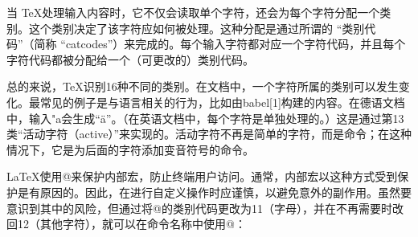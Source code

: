 \documentclass{ctexart}
\begin{document}
当 \TeX 处理输入内容时，它不仅会读取单个字符，还会为每个字符分配一个类别。这个类别决定了该字符应如何被处理。这种分配是通过所谓的 “类别代码”（简称 “catcodes”）来完成的。每个输入字符都对应一个字符代码，并且每个字符代码都被分配给一个（可更改的）类别代码。

总的来说，\TeX 识别16种不同的类别。在文档中，一个字符所属的类别可以发生变化。最常见的例子是与语言相关的行为，比如由babel[1]构建的内容。在德语文档中，输入"a会生成“ä”。（在英语文档中，每个字符是单独处理的。）这是通过第13类“活动字符（active）”来实现的。活动字符不再是简单的字符，而是命令；在这种情况下，它是为后面的字符添加变音符号的命令。

\LaTeX 使用@来保护内部宏，防止终端用户访问。通常，内部宏以这种方式受到保护是有原因的。因此，在进行自定义操作时应谨慎，以避免意外的副作用。虽然要意识到其中的风险，但通过将@的类别代码更改为11（字母），并在不再需要时改回12（其他字符），就可以在命令名称中使用@： 
\end{document}
